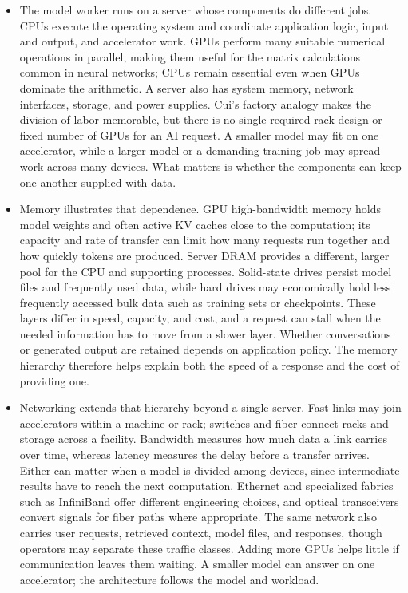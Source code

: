 \documentclass[10pt]{article}
\begin{document}
\begin{itemize}[leftmargin=1.25em, itemsep=0.3em, parsep=0pt, topsep=0pt]
    \item The model worker runs on a server whose components do different jobs. CPUs execute the operating system and coordinate application logic, input and output, and accelerator work. GPUs perform many suitable numerical operations in parallel, making them useful for the matrix calculations common in neural networks; CPUs remain essential even when GPUs dominate the arithmetic. A server also has system memory, network interfaces, storage, and power supplies. Cui's factory analogy makes the division of labor memorable, but there is no single required rack design or fixed number of GPUs for an AI request. A smaller model may fit on one accelerator, while a larger model or a demanding training job may spread work across many devices. What matters is whether the components can keep one another supplied with data.

    \item Memory illustrates that dependence. GPU high-bandwidth memory holds model weights and often active KV caches close to the computation; its capacity and rate of transfer can limit how many requests run together and how quickly tokens are produced. Server DRAM provides a different, larger pool for the CPU and supporting processes. Solid-state drives persist model files and frequently used data, while hard drives may economically hold less frequently accessed bulk data such as training sets or checkpoints. These layers differ in speed, capacity, and cost, and a request can stall when the needed information has to move from a slower layer. Whether conversations or generated output are retained depends on application policy. The memory hierarchy therefore helps explain both the speed of a response and the cost of providing one.

    \item Networking extends that hierarchy beyond a single server. Fast links may join accelerators within a machine or rack; switches and fiber connect racks and storage across a facility. Bandwidth measures how much data a link carries over time, whereas latency measures the delay before a transfer arrives. Either can matter when a model is divided among devices, since intermediate results have to reach the next computation. Ethernet and specialized fabrics such as InfiniBand offer different engineering choices, and optical transceivers convert signals for fiber paths where appropriate. The same network also carries user requests, retrieved context, model files, and responses, though operators may separate these traffic classes. Adding more GPUs helps little if communication leaves them waiting. A smaller model can answer on one accelerator; the architecture follows the model and workload.


\end{itemize}
\end{document}
